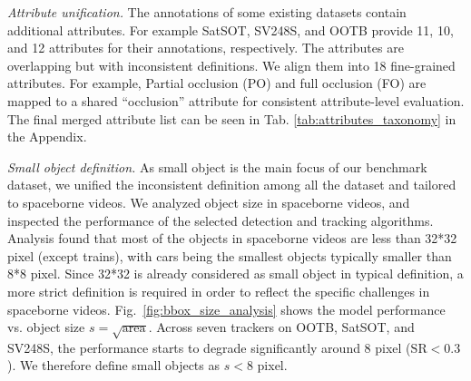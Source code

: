 \documentclass{article}
\begin{document}
\noindent \textit{Attribute unification.} The annotations of some existing datasets contain additional attributes. For example SatSOT, SV248S, and OOTB provide 11, 10, and 12 attributes for their annotations, respectively. The attributes are overlapping but with inconsistent definitions.  We align them into 18 fine-grained attributes. For example, Partial occlusion (PO) and full occlusion (FO) are mapped to a shared ``occlusion'' attribute for consistent attribute-level evaluation. The final merged attribute list can be seen in Tab. \ref{tab:attributes_taxonomy} in the Appendix. %

\noindent\textit{Small object definition.}
As small object is the main focus of our benchmark dataset, we unified the inconsistent definition among all the dataset and tailored to spaceborne videos. We analyzed object size in spaceborne videos, and inspected the performance of the selected detection and tracking algorithms. Analysis found that most of the objects in spaceborne videos are less than 32*32 pixel (except trains), with cars being the smallest objects typically smaller than 8*8 pixel. Since 32*32 is already considered as small object in typical definition, a more strict definition is required in order to reflect the specific challenges in spaceborne videos. Fig.~\ref{fig:bbox_size_analysis} shows the model performance vs. object size \(s=\sqrt{\mathrm{area}}\). Across seven trackers on OOTB, SatSOT, and SV248S, the performance starts to degrade significantly around 8 pixel (\(\mathrm{SR}<0.3\)). %
We therefore define small objects as \(s<8\) pixel. %
\end{document}
